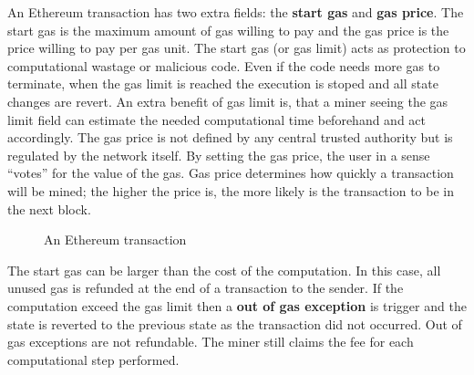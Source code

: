 An Ethereum transaction has two extra fields: the \textbf{start gas} and \textbf{gas price}. The start gas is the maximum amount of gas willing to pay and the gas price is the price willing to pay per gas unit. The start gas (or gas limit) acts as protection to computational wastage or malicious code. Even if the code needs more gas to terminate, when the gas limit is reached the execution is stoped and all state changes are revert. An extra benefit of gas limit is, that a miner seeing the gas limit field can estimate the needed computational time beforehand and act accordingly. The gas price is not defined by any central trusted authority but is regulated by the network itself. By setting the gas price, the user in a sense ``votes'' for the value of the gas. Gas price determines how quickly a transaction will be mined; the higher the price is, the more likely is the transaction to be in the next block.

\begin{figure}[!ht]
  \centering
  \caption{An Ethereum transaction}
  \label{fig:eth_transaction}
\end{figure}

The start gas can be larger than the cost of the computation. In this case, all unused gas is refunded at the end of a transaction to the sender. If the computation exceed the gas limit then a \textbf{out of gas exception} is trigger and the state is reverted to the previous state as the transaction did not occurred. Out of gas exceptions are not refundable. The miner still claims the fee for each computational step performed.

